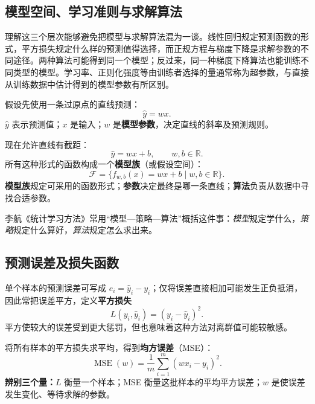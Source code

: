 \subsection{模型空间、学习准则与求解算法}

理解这三个层次能够避免把模型与求解算法混为一谈。线性回归规定预测函数的形式，平方损失规定什么样的预测值得选择，而正规方程与梯度下降是求解参数的不同途径。两种算法可能得到同一个模型；反过来，同一种梯度下降算法也能训练不同类型的模型。学习率、正则化强度等由训练者选择的量通常称为超参数，与直接从训练数据中估计得到的模型参数有所区别。

假设先使用一条过原点的直线预测：
\begin{equation}\label{eq:model-no-intercept}
\hat y=wx.
\end{equation}
$\hat y$ 表示预测值；$x$ 是输入；$w$ 是\textbf{模型参数}，决定直线的斜率及预测规则。

现在允许直线有截距：
\[
\hat y=wx+b,\qquad w,b\in\mathbb R.
\]
所有这种形式的函数构成一个\textbf{模型族}（或假设空间）：
\begin{equation}\label{eq:linear-family}
\mathcal F=\{f_{w,b}(x)=wx+b\mid w,b\in\mathbb R\}.
\end{equation}
\textbf{模型族}规定可采用的函数形式；\textbf{参数}决定最终是哪一条直线；\textbf{算法}负责从数据中寻找合适参数。

李航《统计学习方法》常用“模型—策略—算法”概括这件事：\emph{模型}规定学什么，\emph{策略}规定什么算好，\emph{算法}规定怎么求出来\cite[第1章]{lihang2019}。

\subsection{预测误差及损失函数}

单个样本的预测误差可写成 $e_i=\hat y_i-y_i$；仅将误差直接相加可能发生正负抵消，因此常把误差平方，定义\textbf{平方损失}
\begin{equation}\label{eq:squared-loss}
L(y_i,\hat y_i)=(y_i-\hat y_i)^2.
\end{equation}
平方使较大的误差受到更大惩罚，但也意味着这种方法对离群值可能较敏感。

将所有样本的平方损失求平均，得到\textbf{均方误差}（MSE）：
\begin{equation}\label{eq:intro-mse}
\operatorname{MSE}(w)=\frac1m\sum_{i=1}^{m}(wx_i-y_i)^2.
\end{equation}
\textbf{辨别三个量：}$L$ 衡量一个样本；MSE 衡量这批样本的平均平方误差；$w$ 是使误差发生变化、等待求解的参数。

